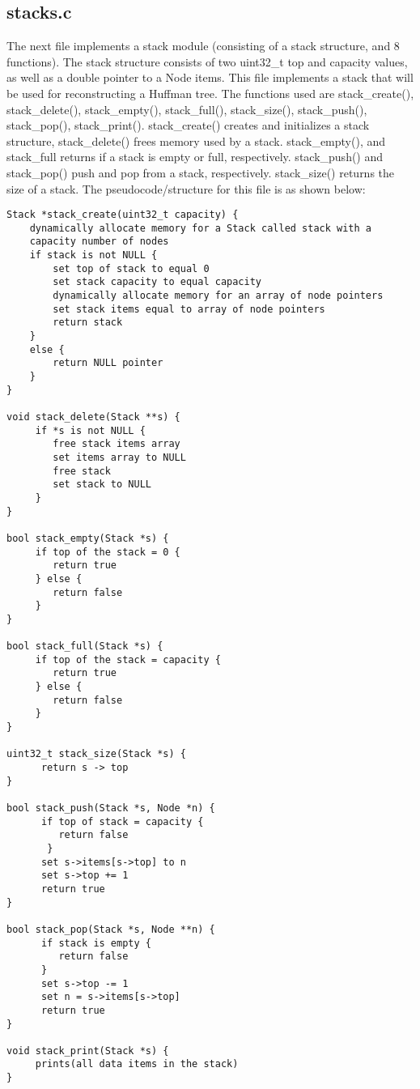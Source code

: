 \documentclass[11pt]{article}
\begin{document}
\subsection{stacks.c}
The next file implements a stack module (consisting of a stack structure, and 8 functions). The stack structure consists of two uint32\_t top and capacity values, as well as a double pointer to a Node items. This file implements a stack that will be used for reconstructing a Huffman tree. The functions used are stack\_create(), stack\_delete(), stack\_empty(), stack\_full(), stack\_size(), stack\_push(), stack\_pop(), stack\_print(). stack\_create() creates and initializes a stack structure, stack\_delete() frees memory used by a stack. stack\_empty(), and stack\_full returns if a stack is empty or full, respectively. stack\_push() and stack\_pop() push and pop from a stack, respectively. stack\_size() returns the size of a stack. The pseudocode/structure for this file is as shown below:

\begin{verbatim}
Stack *stack_create(uint32_t capacity) {
    dynamically allocate memory for a Stack called stack with a 
    capacity number of nodes 
    if stack is not NULL {
        set top of stack to equal 0
        set stack capacity to equal capacity
        dynamically allocate memory for an array of node pointers
        set stack items equal to array of node pointers
        return stack
    }
    else {
        return NULL pointer
    }
}

void stack_delete(Stack **s) {
     if *s is not NULL {
        free stack items array
        set items array to NULL
        free stack
        set stack to NULL
     }
}

bool stack_empty(Stack *s) {
     if top of the stack = 0 {
        return true
     } else {
        return false
     }
}

bool stack_full(Stack *s) {
     if top of the stack = capacity {
        return true
     } else {
        return false
     }
}

uint32_t stack_size(Stack *s) {
      return s -> top
}

bool stack_push(Stack *s, Node *n) {
      if top of stack = capacity {
         return false
       }
      set s->items[s->top] to n
      set s->top += 1
      return true
}

bool stack_pop(Stack *s, Node **n) {
      if stack is empty {
         return false
      }
      set s->top -= 1
      set n = s->items[s->top]
      return true
}

void stack_print(Stack *s) {
     prints(all data items in the stack)
}

\end{verbatim}
\end{document}
